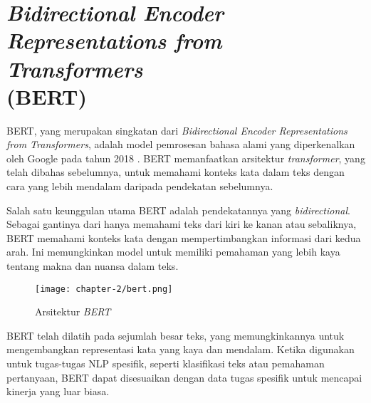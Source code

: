 \section{\textit{Bidirectional Encoder Representations from Transformers} \\ (BERT)}

BERT, yang merupakan singkatan dari \textit{Bidirectional Encoder Representations from Transformers}, adalah model pemrosesan bahasa alami yang diperkenalkan oleh Google pada tahun 2018 \parencite{bert}. BERT memanfaatkan arsitektur \textit{transformer}, yang telah dibahas sebelumnya, untuk memahami konteks kata dalam teks dengan cara yang lebih mendalam daripada pendekatan sebelumnya.

Salah satu keunggulan utama BERT adalah pendekatannya yang \textit{bidirectional}. Sebagai gantinya dari hanya memahami teks dari kiri ke kanan atau sebaliknya, BERT memahami konteks kata dengan mempertimbangkan informasi dari kedua arah. Ini memungkinkan model untuk memiliki pemahaman yang lebih kaya tentang makna dan nuansa dalam teks.

\begin{figure}[ht]
    \centering
    \texttt{[image: chapter-2/bert.png]}
    \caption{Arsitektur \textit{BERT}}
    \label{fig:bert}
\end{figure}

BERT telah dilatih pada sejumlah besar teks, yang memungkinkannya untuk mengembangkan representasi kata yang kaya dan mendalam. Ketika digunakan untuk tugas-tugas NLP spesifik, seperti klasifikasi teks atau pemahaman pertanyaan, BERT dapat disesuaikan dengan data tugas spesifik untuk mencapai kinerja yang luar biasa.
